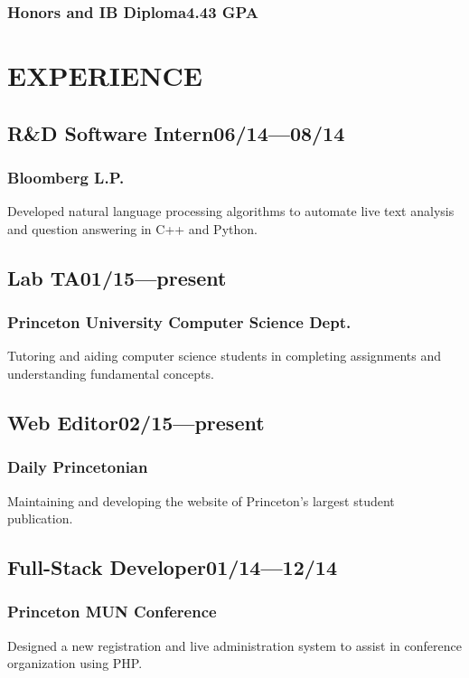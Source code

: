 \documentclass[11pt]{article}
\begin{document}
\begin{multicols}{2}
\subsubsection*{Honors and IB Diploma\hfill\textnormal{4.43 GPA}}
\vspace{1.5\baselineskip}

\section*{EXPERIENCE}
\subsection*{R\&D Software Intern\hfill\textnormal{06/14---08/14}}
\subsubsection*{Bloomberg L.P.}
Developed natural language processing algorithms to automate live text analysis and question answering in C++ and Python.

\subsection*{Lab TA\hfill\textnormal{01/15---present}}
\subsubsection*{Princeton University Computer Science Dept.}
Tutoring and aiding computer science students in completing assignments and understanding fundamental concepts.

\subsection*{Web Editor\hfill\textnormal{02/15---present}}
\subsubsection*{Daily Princetonian}
Maintaining and developing the website of Princeton's largest student publication.

\subsection*{Full-Stack Developer\hfill\textnormal{01/14---12/14}}
\subsubsection*{Princeton MUN Conference}
Designed a new registration and live administration system to assist in conference organization using PHP.


\end{multicols}
\end{document}
